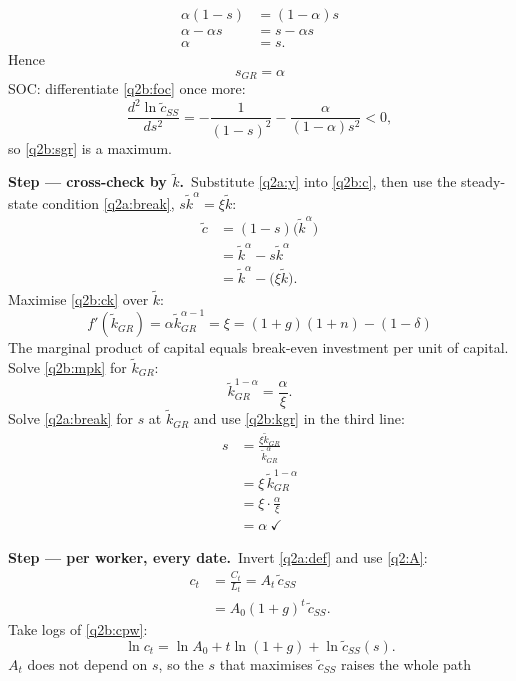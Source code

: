 \documentclass[11pt,a4paper]{article}
\newcommand{\passo}[2]{\par\smallskip\noindent\textbf{Step --- #1.}~#2}
\begin{document}
\begin{sol}
\begin{align*}
\alpha(1-s) &= (1-\alpha)s\\
\alpha-\alpha s &= s-\alpha s\\
\alpha &= s.
\end{align*}
Hence
\begin{equation}
\boxed{s_{GR}=\alpha} \label{q2b:sgr}
\end{equation}
SOC: differentiate \eqref{q2b:foc} once more:
\[
\frac{d^2\ln\tilde c_{SS}}{ds^2}=-\frac{1}{(1-s)^2}-\frac{\alpha}{(1-\alpha)s^2}<0,
\]
so \eqref{q2b:sgr} is a maximum.
\passo{cross-check by $\tilde k$}{Substitute \eqref{q2a:y} into \eqref{q2b:c}, then use the
steady-state condition \eqref{q2a:break}, $s\tilde k^{\alpha}=\xi\tilde k$:}
\begin{align}
\tilde c &= (1-s)\big(\tilde k^{\alpha}\big)\nonumber\\
&= \tilde k^{\alpha}-s\tilde k^{\alpha}\nonumber\\
&= \tilde k^{\alpha}-\big(\xi\tilde k\big). \label{q2b:ck}
\end{align}
Maximise \eqref{q2b:ck} over $\tilde k$:
\begin{equation}
\boxed{f'(\tilde k_{GR})=\alpha\tilde k_{GR}^{\alpha-1}=\xi=(1+g)(1+n)-(1-\delta)} \label{q2b:mpk}
\end{equation}
The marginal product of capital equals break-even investment per unit of capital. Solve
\eqref{q2b:mpk} for $\tilde k_{GR}$:
\begin{equation}
\tilde k_{GR}^{1-\alpha}=\frac{\alpha}{\xi}. \label{q2b:kgr}
\end{equation}
Solve \eqref{q2a:break} for $s$ at $\tilde k_{GR}$ and use \eqref{q2b:kgr} in the third line:
\begin{align*}
s &= \frac{\xi\tilde k_{GR}}{\tilde k_{GR}^{\alpha}}\\
&= \xi\,\tilde k_{GR}^{1-\alpha}\\
&= \xi\cdot\frac{\alpha}{\xi}\\
&= \alpha\ \checkmark
\end{align*}
\passo{per worker, every date}{Invert \eqref{q2a:def} and use \eqref{q2:A}:}
\begin{align}
c_t &= \frac{C_t}{L_t}=A_t\,\tilde c_{SS}\nonumber\\
&= A_0(1+g)^t\,\tilde c_{SS}. \label{q2b:cpw}
\end{align}
Take logs of \eqref{q2b:cpw}:
\begin{equation}
\ln c_t=\ln A_0+t\ln(1+g)+\ln\tilde c_{SS}(s). \label{q2b:lncpw}
\end{equation}
$A_t$ does not depend on $s$, so the $s$ that maximises $\tilde c_{SS}$ raises the whole path

\end{sol}
\end{document}
